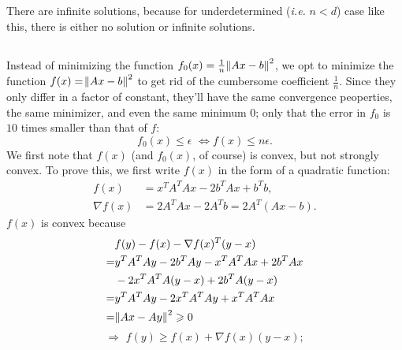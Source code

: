\documentclass[11pt]{article}
\begin{document}
\subsection{}

\section{}
\subsection{}
There are infinite solutions, because for underdetermined (\textit{i.e.} $n<d$) case like this, there is either no solution or infinite solutions.

\subsection{}
Instead of minimizing the function $f_0(x) = \frac1n\norm{Ax-b}^2$, we opt to minimize the function $f(x) = \norm{Ax-b}^2$ to get rid of the cumbersome coefficient $\frac1n$. Since they only differ in a factor of constant, they'll have the same convergence peoperties, the same minimizer, and even the same minimum $0$; only that the error in $f_0$ is $10$ times smaller than that of $f$:
$$f_0(x) \leqslant \epsilon \,\,\Leftrightarrow f(x) \leqslant n\epsilon.$$
We first note that $f(x)$ (and $f_0(x)$, of course) is convex, but not strongly convex. To prove this, we first write $f(x)$ in the form of a quadratic function:
\begin{equation}\begin{split}
f(x) &= x^TA^TAx -2b^TAx+b^Tb, \\
\nabla f(x) &= 2 A^TAx-2A^Tb = 2A^T(Ax-b).
\end{split}\nonumber\end{equation} 
$f(x)$ is convex because 
\begin{equation}\begin{split} 
&f(y) - f(x) -\nabla f(x)^T(y-x) \\
=& y^TA^TAy - 2b^TAy - x^TA^TAx + 2b^TAx \\
&- 2x^TA^TA(y-x) + 2b^TA(y-x)\\
=& y^TA^TAy -2x^TA^TAy + x^TA^TAx \\
=&\norm{Ax-Ay}^2 \geqslant 0 \\
\end{split}\nonumber\end{equation} 
$$\Longrightarrow \,\, f(y) \geqslant f(x) +\nabla f(x)(y-x);$$
\end{document}

